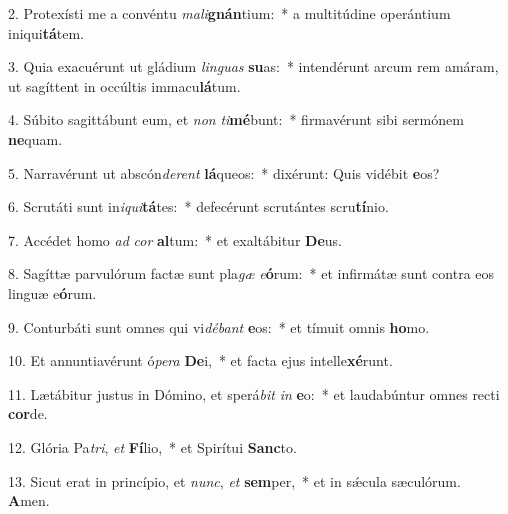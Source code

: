 2. Protexísti me a convéntu \textit{ma}\textit{li}\textbf{gnán}tium:~*  a multitúdine operántium iniqui\textbf{tá}tem.\

3. Quia exacuérunt ut gládium \textit{lin}\textit{guas} \textbf{su}as:~*  intendérunt arcum rem amáram, ut sagíttent in occúltis immacu\textbf{lá}tum.\

4. Súbito sagittábunt eum, et \textit{non} \textit{ti}\textbf{mé}bunt:~*  firmavérunt sibi sermónem \textbf{ne}quam.\

5. Narravérunt ut abscón\textit{de}\textit{rent} \textbf{lá}queos:~*  dixérunt: Quis vidébit \textbf{e}os?\

6. Scrutáti sunt in\textit{i}\textit{qui}\textbf{tá}tes:~*  defecérunt scrutántes scru\textbf{tí}nio.\

7. Accédet homo \textit{ad} \textit{cor} \textbf{al}tum:~*  et exaltábitur \textbf{De}us.\

8. Sagíttæ parvulórum factæ sunt pla\textit{gæ} \textit{e}\textbf{ó}rum:~*  et infirmátæ sunt contra eos linguæ e\textbf{ó}rum.\

9. Conturbáti sunt omnes qui vi\textit{dé}\textit{bant} \textbf{e}os:~*  et tímuit omnis \textbf{ho}mo.\

10. Et annuntiavérunt ó\textit{pe}\textit{ra} \textbf{De}i,~*  et facta ejus intelle\textbf{xé}runt.\

11. Lætábitur justus in Dómino, et sperá\textit{bit} \textit{in} \textbf{e}o:~*  et laudabúntur omnes recti \textbf{cor}de.\

12. Glória Pa\textit{tri}, \textit{et} \textbf{Fí}lio,~*  et Spirítui \textbf{Sanc}to.\

13. Sicut erat in princípio, et \textit{nunc}, \textit{et} \textbf{sem}per,~*  et in sǽcula sæculórum. \textbf{A}men.\

